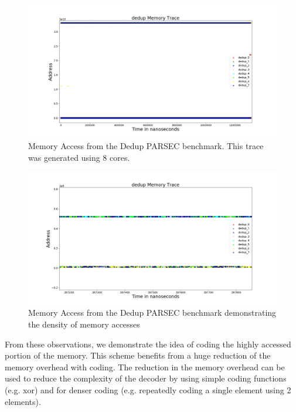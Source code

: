 \begin{figure}[htbp]
		\includegraphics[width=\linewidth]{fig/dedup_whole.png}
		\caption{Memory Access from the Dedup PARSEC benchmark. This trace was generated using 8 cores.}
		\label{fig:dedup_whole}
\end{figure}

\begin{figure}[htbp]
		\includegraphics[width=\linewidth]{fig/dedup_dense.png}
		\caption{Memory Access from the Dedup PARSEC benchmark demonstrating the density of memory accesses}
		\label{fig:dedup_dense}
\end{figure}

From these observations, we demonstrate the idea of coding the 
highly accessed portion of the memory. This scheme benefits from a huge 
reduction of the memory overhead with coding. The reduction in the memory 
overhead can be used to reduce the complexity of the decoder by using simple 
coding functions (e.g. xor) and for denser coding (e.g. repeatedly coding a 
single element using 2 elements). 

